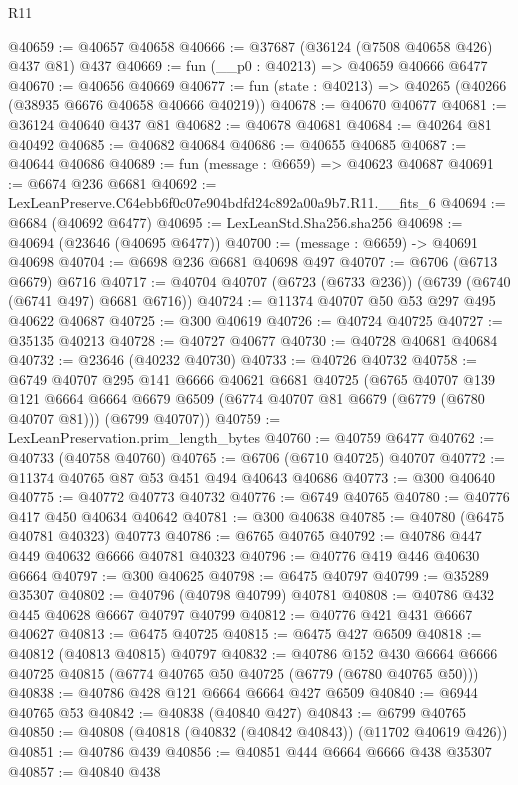 \begin{lexlean}{R11}
\begin{coremodule}
@40659 := @40657 @40658
@40666 := @37687 (@36124 (@7508 @40658 @426) @437 @81) @437
@40669 := fun (__p0 : @40213) => @40659 @40666 @6477
@40670 := @40656 @40669
@40677 := fun (state : @40213) => @40265 (@40266 (@38935 @6676 @40658 @40666 @40219))
@40678 := @40670 @40677
@40681 := @36124 @40640 @437 @81
@40682 := @40678 @40681
@40684 := @40264 @81 @40492
@40685 := @40682 @40684
@40686 := @40655 @40685
@40687 := @40644 @40686
@40689 := fun (message : @6659) => @40623 @40687
@40691 := @6674 @236 @6681
@40692 := LexLeanPreserve.C64ebb6f0c07e904bdfd24c892a00a9b7.R11.__fits_6
@40694 := @6684 (@40692 @6477)
@40695 := LexLeanStd.Sha256.sha256
@40698 := @40694 (@23646 (@40695 @6477))
@40700 := (message : @6659) -> @40691 @40698
@40704 := @6698 @236 @6681 @40698 @497
@40707 := @6706 (@6713 @6679) @6716
@40717 := @40704 @40707 (@6723 (@6733 @236)) (@6739 (@6740 (@6741 @497) @6681 @6716))
@40724 := @11374 @40707 @50 @53 @297 @495 @40622 @40687
@40725 := @300 @40619
@40726 := @40724 @40725
@40727 := @35135 @40213
@40728 := @40727 @40677
@40730 := @40728 @40681 @40684
@40732 := @23646 (@40232 @40730)
@40733 := @40726 @40732
@40758 := @6749
    @40707
    @295
    @141
    @6666
    @40621
    @6681
    @40725
    (@6765
      @40707
      @139
      @121
      @6664
      @6664
      @6679
      @6509
      (@6774 @40707 @81 @6679 (@6779 (@6780 @40707 @81)))
      (@6799 @40707))
@40759 := LexLeanPreservation.prim_length_bytes
@40760 := @40759 @6477
@40762 := @40733 (@40758 @40760)
@40765 := @6706 (@6710 @40725) @40707
@40772 := @11374 @40765 @87 @53 @451 @494 @40643 @40686
@40773 := @300 @40640
@40775 := @40772 @40773 @40732
@40776 := @6749 @40765
@40780 := @40776 @417 @450 @40634 @40642
@40781 := @300 @40638
@40785 := @40780 (@6475 @40781 @40323) @40773
@40786 := @6765 @40765
@40792 := @40786 @447 @449 @40632 @6666 @40781 @40323
@40796 := @40776 @419 @446 @40630 @6664
@40797 := @300 @40625
@40798 := @6475 @40797
@40799 := @35289 @35307
@40802 := @40796 (@40798 @40799) @40781
@40808 := @40786 @432 @445 @40628 @6667 @40797 @40799
@40812 := @40776 @421 @431 @6667 @40627
@40813 := @6475 @40725
@40815 := @6475 @427 @6509
@40818 := @40812 (@40813 @40815) @40797
@40832 := @40786
    @152
    @430
    @6664
    @6666
    @40725
    @40815
    (@6774 @40765 @50 @40725 (@6779 (@6780 @40765 @50)))
@40838 := @40786 @428 @121 @6664 @6664 @427 @6509
@40840 := @6944 @40765 @53
@40842 := @40838 (@40840 @427)
@40843 := @6799 @40765
@40850 := @40808 (@40818 (@40832 (@40842 @40843)) (@11702 @40619 @426))
@40851 := @40786 @439
@40856 := @40851 @444 @6664 @6666 @438 @35307
@40857 := @40840 @438

\end{coremodule}
\end{lexlean}
